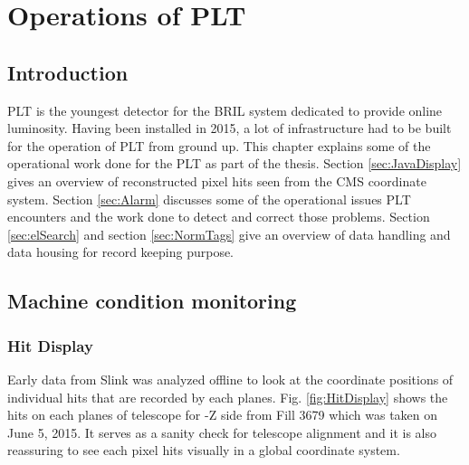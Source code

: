 \chapter{Operations of PLT} \label{ch:operations}
\section{Introduction}


PLT is the youngest detector for the BRIL system dedicated to provide online luminosity. Having been installed in 2015, a lot of infrastructure had to be built for the operation of PLT from ground up. This chapter explains some of the operational work done for the PLT as part of the thesis. Section \ref{sec:JavaDisplay} gives an overview of reconstructed pixel hits seen from the CMS coordinate system. Section \ref{sec:Alarm} discusses some of the operational issues PLT encounters and the work done to detect and correct those problems. Section \ref{sec:elSearch} and  section \ref{sec:NormTags} give an overview of data handling and data housing for record keeping purpose.


\section{Machine condition monitoring}

\subsection{Hit Display}\label{sec:HitDisplay}
Early data from Slink was analyzed offline to look at the coordinate positions of individual hits that are recorded by each planes. Fig. \ref{fig:HitDisplay} shows the hits on each planes of telescope for -Z side from Fill 3679 which was taken on June 5, 2015. It serves as a sanity check for telescope alignment and it is also reassuring to see each pixel hits visually in a global coordinate system.

